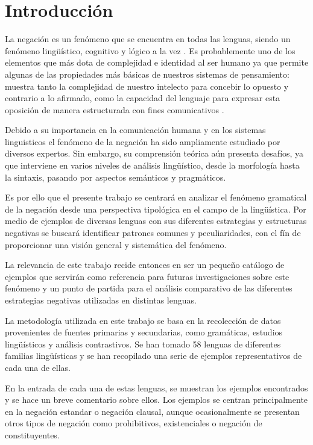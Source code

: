 \section*{Introducción}

\noindent La negación es un fenómeno que se encuentra en todas las lenguas, siendo un fenómeno lingüístico, cognitivo y lógico a la vez \textcolor{MidnightBlue}{\citep{lawler}}. Es probablemente uno de los elementos que más dota de complejidad e identidad al ser humano ya que permite algunas de las propiedades más básicas de nuestros sistemas de pensamiento: muestra tanto la complejidad de nuestro intelecto para concebir lo opuesto y contrario a lo afirmado, como la capacidad del lenguaje para expresar esta oposición de manera estructurada con fines comunicativos \textcolor{MidnightBlue}{\citep{horn,hornKato}}. 

Debido a su importancia en la comunicación humana y en los sistemas linguisticos el fenómeno de la negación ha sido ampliamente estudiado por diversos expertos. Sin embargo, su comprensión teórica aún presenta desafíos, ya que interviene en varios niveles de análisis lingüístico, desde la morfología hasta la sintaxis, pasando por aspectos semánticos y pragmáticos. 

Es por ello que el presente trabajo se centrará en analizar el fenómeno gramatical de la negación desde una perspectiva tipológica en el campo de la lingüística. Por medio de ejemplos de diversas lenguas con sus diferentes estrategias y estructuras negativas se buscará identificar patrones comunes y peculiaridades, con el fín de proporcionar una visión general y sistemática del fenómeno.

La relevancia de este trabajo recide entonces en ser un pequeño catálogo de ejemplos que servirán como referencia para futuras investigaciones sobre este fenómeno y un punto de partida para el análisis comparativo de las diferentes estrategias negativas utilizadas en distintas lenguas. 

La metodología utilizada en este trabajo se basa en la recolección de datos provenientes de fuentes primarias y secundarias, como gramáticas, estudios lingüísticos y análisis contrastivos. Se han tomado 58 lenguas de diferentes familias lingüísticas y se han recopilado una serie de ejemplos representativos de cada una de ellas.

En la entrada de cada una de estas lenguas, se muestran los ejemplos encontrados y se hace un breve comentario sobre ellos. Los ejemplos se centran principalmente en la negación estandar o negación clausal, aunque ocasionalmente se presentan otros tipos de negación como prohibitivos, existenciales o negación de constituyentes.

